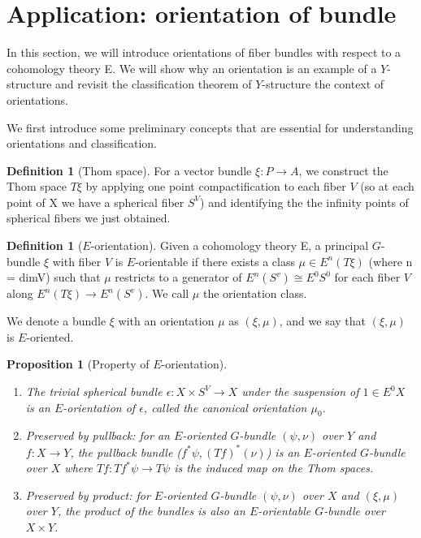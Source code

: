\documentclass[psamsfonts]{amsart}
\newtheorem{prop}[thm]{Proposition}
\theoremstyle{definition}
\newtheorem{defn}[thm]{Definition}
\theoremstyle{remark}
\numberwithin{equation}{section}
\begin{document}
\section{Application: orientation of bundle}
In this section, we will introduce orientations of fiber bundles with respect to a cohomology theory E. We will show why an orientation is an example of a $Y$-structure and revisit the classification theorem of $Y$-structure the context of orientations. 

We first introduce some preliminary concepts that are essential for understanding orientations and classification. 
\begin{defn}[Thom space]
For a vector bundle $\xi: P \rightarrow A$, we construct the Thom space $T\xi$ by applying one point compactification to each fiber $V$ (so at each point of X we have a spherical fiber $S^{V}$) and identifying the the infinity points of  spherical fibers we just obtained.
\end{defn}

\begin{defn}[$E$-orientation]
\label{def:Eorientation}
Given a cohomology theory E, a principal $G$-bundle $\xi$ with fiber $V$ is $E$-orientable if there exists a class $\mu \in E^{n}(T\xi)$ (where n = dimV) such that $\mu$ restricts to a generator of $E^{n}(S^{v}) \cong E^{0}S^{0}$ for each fiber $V$ along $E^{n}(T\xi) \rightarrow E^{n}(S^{v})$. We call $\mu$ the orientation class.        

We denote a bundle $\xi$ with an orientation $\mu$ as $(\xi, \mu)$, and we say that $(\xi, \mu)$ is $E$-oriented.
\end{defn}


\begin{prop}[Property of $E$-orientation]
\leavevmode
\begin{enumerate}
	\item The trivial spherical bundle $\epsilon: X \times S^{V} \to X$ under the suspension of $1 \in E^{0}X$ is an $E$-orientation of $\epsilon$, called the canonical orientation $\mu_{0}$.
	\item Preserved by pullback: for an $E$-oriented $G$-bundle $(\psi, \nu)$ over $Y$ and $f: X \to Y$, the pullback bundle ($f^{*}\psi, (Tf)^{*}(\nu)$) is an $E$-oriented $G$-bundle over $X$ where $Tf: Tf^{*}\psi \to T\psi$ is the induced map on the Thom spaces.
	\item Preserved by product: for $E$-oriented $G$-bundle $(\psi, \nu)$ over $X$ and $(\xi, \mu)$ over $Y$, the product of the bundles is also an $E$-orientable $G$-bundle over $X \times Y$.
\end{enumerate}
\end{prop}
\end{document}
